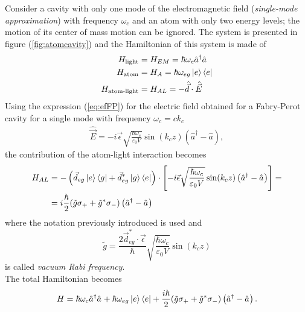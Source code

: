 Consider a cavity with only one mode of the electromagnetic field (\textit{single-mode approximation}) with frequency $\omega_c$ and an atom with only two energy levels; the motion of its center of mass motion can be ignored. The system is presented in figure (\ref{fig:atomcavity}) and the Hamiltonian of this system is made of 
\begin{align*}
    H_\text{light} & = H_{EM} = \hbar \omega_c \hat{a}^{\dagger}_{} \hat{a}_{} \\
    H_\text{atom} & = H_A = \hbar \omega_{eg} \ket{e}\bra{e} \\
    H_\text{atom-light} & = H_{AL}= -\hat{\Vec{d}} \cdot \hat{\Vec{E}}\\
\end{align*}
Using the expression (\ref{eq:efFP}) for the electric field obtained for a Fabry-Perot cavity for a single mode with frequency $\omega_c = c k_c $ 
\begin{align*}
    \hat{\Vec{E}} = -i \Vec{\epsilon} \sqrt{\frac{\hbar \omega_c}{\varepsilon_0 V}} \sin{(k_c z)} \left( \hat{a}^\dagger - \hat{a} \right), 
\end{align*}
the contribution of the atom-light interaction becomes 
\begin{align*}
    H_{AL} & = - \left( \Vec{d}_{eg} \ket{e}\bra{g} + \Vec{d}^*_{eg} \ket{g}\bra{e} \right) \cdot \left[-i \Vec{\epsilon} \sqrt{\frac{\hbar \omega_c}{\varepsilon_0 V}} \sin(k_c z) \left(\hat{a}^{\dagger}_{} -  \hat{a}_{}\right)\right] = \\
    &= i \dfrac{\hbar}{2} (\tilde{g} \sigma_{+} + \tilde{g}^{\ast} \sigma_{-}) \left(\hat{a}^{\dagger}_{} -  \hat{a}_{}\right)
\end{align*}
where the notation previously introduced is used and 
\begin{equation*}
    \tilde{g} = \frac{2\Vec{d}_{eg}^* \cdot \Vec{\epsilon}}{\hbar} \sqrt{\frac{\hbar \omega_c}{\varepsilon_0 V}}  \sin(k_c z)
\end{equation*}
is called \textit{vacuum Rabi frequency}. \\
The total Hamiltonian becomes
\begin{equation}
    H =  \hbar \omega_c \hat{a}^{\dagger}_{} \hat{a}_{} + \hbar \omega_{eg} \ket{e}\bra{e} + \frac{i \hbar}{2} (\tilde{g} \sigma_{+} +\tilde{g}^{\ast} \sigma_{-}) \left(\hat{a}^{\dagger}_{} -  \hat{a}_{}\right).
\end{equation}

